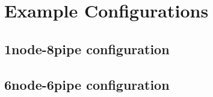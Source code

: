 \chapter{Example Configurations}

\section{1node-8pipe configuration}
\label{app:1nodeConfig}


\section{6node-6pipe configuration}
\label{app:6nodeConfig}

